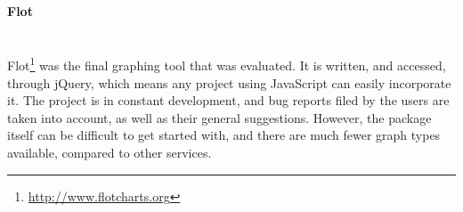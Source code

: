 \paragraph{Flot}\ \\
Flot\footnote{\url{http://www.flotcharts.org}} was the final graphing tool that was evaluated. It is written, and accessed, through jQuery, which means any project using JavaScript can easily incorporate it. The project is in constant development, and bug reports filed by the users are taken into account, as well as their general suggestions. However, the package itself can be difficult to get started with, and there are much fewer graph types available, compared to other services.